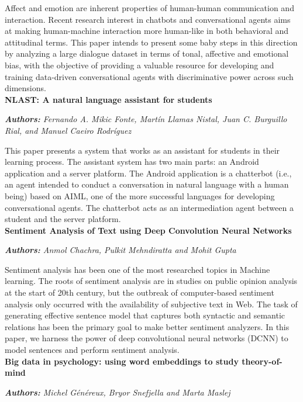 \documentclass[conference,compsoc]{IEEEtran}
\begin{document}
Affect and emotion are inherent properties of human-human communication and interaction. Recent research interest in chatbots and conversational agents aims at making human-machine interaction more human-like in both behavioral and attitudinal terms. This paper intends to present some baby steps in this direction by analyzing a large dialogue dataset in terms of tonal, affective and emotional bias, with the objective of providing a valuable resource for developing and training data-driven conversational agents with discriminative power across such dimensions.\\

\noindent
\textbf{NLAST: A natural language assistant for students}

\noindent
\textit{\textbf{Authors:} Fernando A. Mikic Fonte, Martín Llamas Nistal, Juan C. Burguillo Rial, and Manuel Caeiro Rodríguez}

This paper presents a system that works as an assistant for students in their learning process. The assistant system has two main parts: an Android application and a server platform. The Android application is a chatterbot (i.e., an agent intended to conduct a conversation in natural language with a human being) based on AIML, one of the more successful languages for developing conversational agents. The chatterbot acts as an intermediation agent between a student and the server platform.\\

\noindent
\textbf{Sentiment Analysis of Text using Deep Convolution Neural Networks}

\noindent
\textit{\textbf{Authors:} Anmol Chachra, Pulkit Mehndiratta and Mohit Gupta}

Sentiment analysis has been one of the most researched topics in Machine learning. The roots of sentiment analysis are in studies on public opinion analysis at the start of 20th century, but the outbreak of computer-based sentiment analysis only occurred with the availability of subjective text in Web. The task of generating effective sentence model that captures both syntactic and semantic relations has been the primary goal to make better sentiment analyzers. In this paper, we harness the power of deep convolutional neural networks (DCNN) to model sentences and perform sentiment analysis.\\

\noindent
\textbf{Big data in psychology: using word embeddings to study theory-of-mind}

\noindent
\textit{\textbf{Authors:} Michel Généreux, Bryor Snefjella and Marta Maslej}
\end{document}
